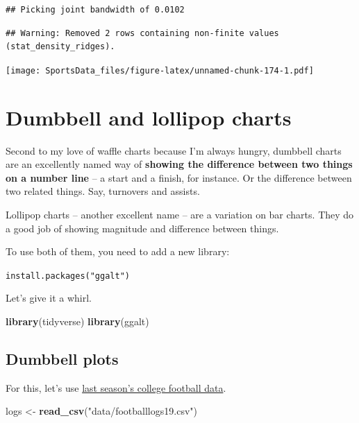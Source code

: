 \documentclass[
]{book}
\newenvironment{Shaded}{\begin{snugshade}}{\end{snugshade}}
\newcommand{\KeywordTok}[1]{\textcolor[rgb]{0.13,0.29,0.53}{\textbf{#1}}}
\newcommand{\NormalTok}[1]{#1}
\newcommand{\StringTok}[1]{\textcolor[rgb]{0.31,0.60,0.02}{#1}}
\begin{document}
\begin{verbatim}
## Picking joint bandwidth of 0.0102
\end{verbatim}

\begin{verbatim}
## Warning: Removed 2 rows containing non-finite values (stat_density_ridges).
\end{verbatim}

\texttt{[image: SportsData\_files/figure-latex/unnamed-chunk-174-1.pdf]}

\hypertarget{dumbbell-and-lollipop-charts}{%
\chapter{Dumbbell and lollipop charts}\label{dumbbell-and-lollipop-charts}}

Second to my love of waffle charts because I'm always hungry, dumbbell charts are an excellently named way of \textbf{showing the difference between two things on a number line} -- a start and a finish, for instance. Or the difference between two related things. Say, turnovers and assists.

Lollipop charts -- another excellent name -- are a variation on bar charts. They do a good job of showing magnitude and difference between things.

To use both of them, you need to add a new library:

\texttt{install.packages("ggalt")}

Let's give it a whirl.

\begin{Shaded}
\begin{Highlighting}[]
\KeywordTok{library}\NormalTok{(tidyverse)}
\KeywordTok{library}\NormalTok{(ggalt)}
\end{Highlighting}
\end{Shaded}

\hypertarget{dumbbell-plots}{%
\section{Dumbbell plots}\label{dumbbell-plots}}

For this, let's use \href{https://unl.box.com/s/2prgq48ctoxlukn6kmfjw0u1opda5s0m}{last season's college football data}.

\begin{Shaded}
\begin{Highlighting}[]
\NormalTok{logs <-}\StringTok{ }\KeywordTok{read_csv}\NormalTok{(}\StringTok{"data/footballlogs19.csv"}\NormalTok{)}
\end{Highlighting}
\end{Shaded}
\end{document}
